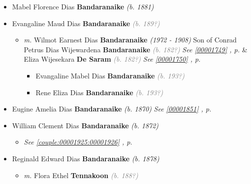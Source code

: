 \documentclass[10pt, openany]{book}
\begin{document}
\begin{itemize}
{\begin{itemize}
{\begin{itemize}
{\begin{itemize}
\end{itemize}}
\end{itemize}
   }
\item{Mabel Florence Dias \textbf{Bandaranaike} \textcolor{slorange}{\textit{(b. 1881)}}
   }
\item{Evangaline Maud Dias \textbf{Bandaranaike} \textcolor{gray}{\textit{(b. 189?)}}
\begin{itemize}
\item{\textit{m.} Wilmot Earnest Dias \textbf{Bandaranaike} \textcolor{slorange}{\textit{(1972 - 1908)}} Son of  Conrad Petrus  Dias Wijewardena \textbf{Bandaranaike} \textcolor{gray}{\textit{(b. 182?)}} \textcolor{slteal}{\textit{See  \autoref{00001749} \textit{, p. \pageref{00001749} }}}  \&  Eliza Wijesekara \textbf{De Saram} \textcolor{gray}{\textit{(b. 182?)}} \textcolor{slteal}{\textit{See  \autoref{00001750} \textit{, p. \pageref{00001750} }}}   \label{couple:00001839:00001840} \begin{itemize}
\item{Evangaline Mabel Dias \textbf{Bandaranaike} \textcolor{gray}{\textit{(b. 193?)}}
   }
\item{Rene Eliza Dias \textbf{Bandaranaike} \textcolor{gray}{\textit{(b. 193?)}}
   }
\end{itemize}}
\end{itemize}
   }
\item{Eugine Amelia Dias \textbf{Bandaranaike} \textcolor{slorange}{\textit{(b. 1870)}} \textcolor{slteal}{\textit{See  \autoref{00001851} \textit{, p. \pageref{00001851} }}}}
\item{William Clement Dias \textbf{Bandaranaike} \textcolor{slorange}{\textit{(b. 1872)}}
\begin{itemize}
\item{\textcolor{slteal}{\textit{See  \autoref{couple:00001925:00001926} \textit{, p. \pageref{couple:00001925:00001926} }}}}
\end{itemize}
   }
\item{Reginald Edward Dias \textbf{Bandaranaike} \textcolor{slorange}{\textit{(b. 1878)}}
\begin{itemize}
\item{\textit{m.} Flora Ethel \textbf{Tennakoon} \textcolor{gray}{\textit{(b. 188?)}}   \label{couple:00001968:00001969} \begin{itemize}

\end{itemize}}
\end{itemize}}
\end{itemize}}
\end{itemize}
\end{document}
